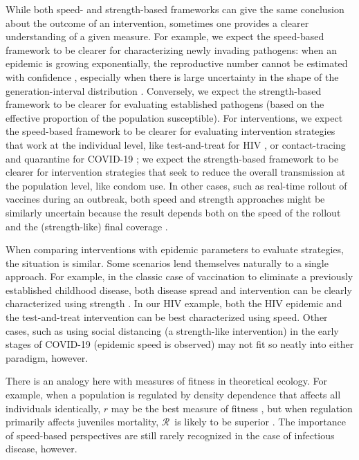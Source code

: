 \documentclass[12pt]{article}
\newcommand{\RR}{\ensuremath{{\mathcal R}}}
\begin{document}
While both speed- and strength-based frameworks can give the same conclusion about the outcome of an intervention, sometimes one provides a clearer understanding of a given measure.
For example, we expect the speed-based framework to be clearer for characterizing newly invading pathogens: when an epidemic is growing exponentially, the reproductive number cannot be estimated with confidence \citep{weitz2015modeling}, especially when there is large uncertainty in the shape of the generation-interval distribution \citep{park2020reconciling}.
Conversely, we expect the strength-based framework to be clearer for evaluating established pathogens (based on the effective proportion of the population susceptible).
For interventions, we expect the speed-based framework to be clearer for evaluating intervention strategies that work at the individual level, like test-and-treat for HIV \citep{granich2009universal}, or contact-tracing and quarantine for COVID-19 \citep{hellewell2020feasibility}; we expect the strength-based framework to be clearer for intervention strategies that seek to reduce the overall transmission at the population level, like condom use.
In other cases, such as real-time rollout of vaccines during an outbreak, both speed and strength approaches might be similarly uncertain because the result depends both on the speed of the rollout and the (strength-like) final coverage \citep{shah2018mumps}.

When comparing interventions with epidemic parameters to evaluate strategies, the situation is similar. Some scenarios lend themselves naturally to a single approach. For example, in the classic case of vaccination to eliminate a previously established childhood disease, both disease spread and intervention can be clearly characterized using strength \citep{anderson1985vaccination}. In our HIV example, both the HIV epidemic and the test-and-treat intervention can be best characterized using speed. Other cases, such as using social distancing (a strength-like intervention) in the early stages of COVID-19 (epidemic speed is observed) may not fit so neatly into either paradigm, however.

There is an analogy here with measures of fitness in theoretical ecology.
For example, when a population is regulated by density dependence that affects all individuals identically, $r$ may be the best measure of fitness \citep{pasztor1996r0}, 
but when regulation primarily affects juveniles mortality, \RR\ is likely to be superior \citep{mylius1995evolutionarily}.
The importance of speed-based perspectives are still rarely recognized in the case of infectious disease, however. 
\end{document}
